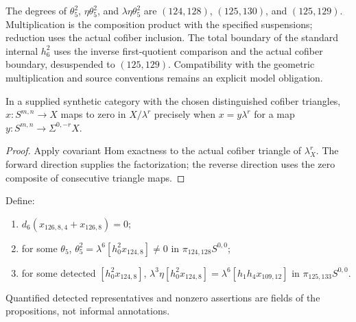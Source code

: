 \begin{definition}
  \label{def:actual-theta5-expressions}
  \notready
  The degrees of $\theta_5^2$, $\eta\theta_5^2$, and $\lambda\eta\theta_5^2$
  are $(124,128)$, $(125,130)$, and $(125,129)$.
  Multiplication is the composition product with the specified suspensions;
  reduction uses the actual cofiber inclusion. The total boundary of the
  standard internal $h_6^2$ uses the inverse first-quotient comparison and
  the actual cofiber boundary, desuspended to $(125,129)$.
  Compatibility with the geometric multiplication and source conventions
  remains an explicit model obligation.
\end{definition}

\begin{lemma}
  \label{lem:actual-quotient-zero-factorization}
  \leanok
  In a supplied synthetic category with the chosen distinguished cofiber
  triangles, $x:S^{m,n}\to X$ maps to zero in $X/\lambda^r$ precisely when
  $x=y\lambda^r$ for a map $y:S^{m,n}\to\Sigma^{0,-r}X$.
\end{lemma}
\begin{proof}
  Apply covariant Hom exactness to the actual cofiber triangle of
  $\lambda^r_X$. The forward direction supplies the factorization; the
  reverse direction uses the zero composite of consecutive triangle maps.
\end{proof}

\begin{definition}
  \label{def:near126-conditions}
  \notready
  Define:
  \begin{enumerate}
    \item[$C_3$:] $d_6(x_{126,8,4}+x_{126,8})=0$;
    \item[$C_4$:] for some $\theta_5$,
      $\theta_5^2=\lambda^6[h_0^2x_{124,8}]\ne0$ in
      $\pi_{124,128}S^{0,0}$;
    \item[$C_5$:] for some detected $[h_0^2x_{124,8}]$,
      $\lambda^3\eta[h_0^2x_{124,8}]
       =\lambda^6[h_1h_4x_{109,12}]$ in
      $\pi_{125,133}S^{0,0}$.
  \end{enumerate}
  Quantified detected representatives and nonzero assertions are fields of the
  propositions, not informal annotations.
\end{definition}

